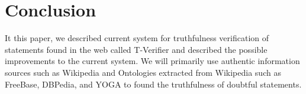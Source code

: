 \documentclass[11pt]{article}
\begin{document}
\section{Conclusion}
It this paper, we described current system for truthfulness verification of statements found in the web called T-Verifier and described the possible improvements to the current system. We will primarily use authentic information sources such as Wikipedia and Ontologies extracted from Wikipedia such as FreeBase, DBPedia, and YOGA to found the truthfulness of doubtful statements.  





\end{document}
